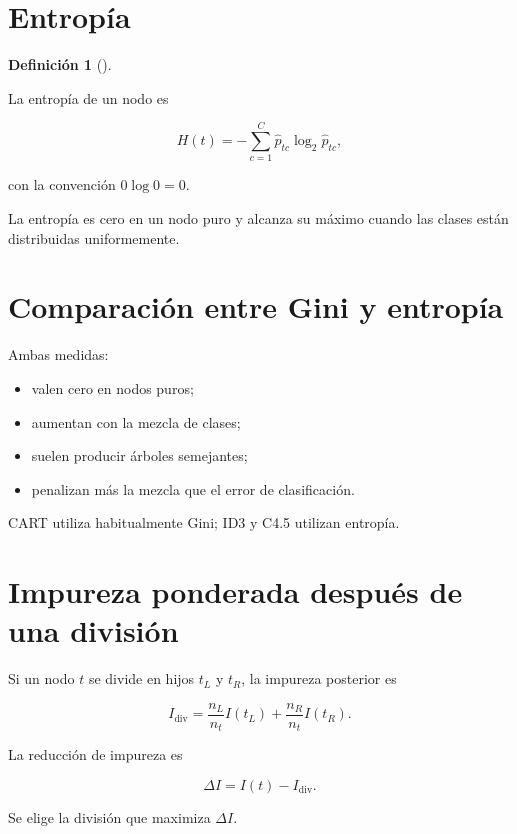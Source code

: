 \documentclass[
  spanish,
  11pt,
  letterpaper,
  DIV=11,
  numbers=noendperiod]{scrreprt}
\providecommand{\tightlist}{%
  \setlength{\itemsep}{0pt}\setlength{\parskip}{0pt}}
\theoremstyle{definition}
\newtheorem{definition}{Definición}[chapter]
\theoremstyle{plain}
\theoremstyle{definition}
\theoremstyle{remark}
\begin{document}
\section{Entropía}\label{entropuxeda}

\begin{definition}[]\protect\hypertarget{def-entropia-arbol}{}\label{def-entropia-arbol}

La entropía de un nodo es

\[
H(t)
=
-
\sum_{c=1}^{C}
\widehat{p}_{tc}
\log_2 \widehat{p}_{tc},
\]

con la convención \(0\log 0=0\).

\end{definition}

La entropía es cero en un nodo puro y alcanza su máximo cuando las
clases están distribuidas uniformemente.

\section{Comparación entre Gini y
entropía}\label{comparaciuxf3n-entre-gini-y-entropuxeda}

Ambas medidas:

\begin{itemize}
\tightlist
\item
  valen cero en nodos puros;
\item
  aumentan con la mezcla de clases;
\item
  suelen producir árboles semejantes;
\item
  penalizan más la mezcla que el error de clasificación.
\end{itemize}

CART utiliza habitualmente Gini; ID3 y C4.5 utilizan entropía.

\section{Impureza ponderada después de una
división}\label{impureza-ponderada-despuuxe9s-de-una-divisiuxf3n}

Si un nodo \(t\) se divide en hijos \(t_L\) y \(t_R\), la impureza
posterior es

\[
I_{\text{div}}
=
\frac{n_L}{n_t}I(t_L)
+
\frac{n_R}{n_t}I(t_R).
\]

La reducción de impureza es

\[
\Delta I
=
I(t)-I_{\text{div}}.
\]

Se elige la división que maximiza \(\Delta I\).
\end{document}
